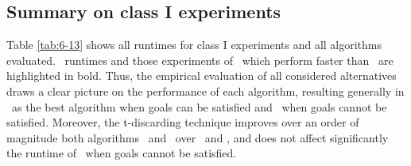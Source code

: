 \subsection{Summary on class I experiments}
\label{chapEmpiricalAnalysis:subsec:summarygridsfinalc1}

Table \ref{tab:6-13} shows all runtimes for class I experiments and all algorithms evaluated. \namoate \ runtimes and those experiments of \lexgo \ which perform faster than \namoate \ are highlighted in bold. Thus, the empirical evaluation of all considered alternatives draws a clear picture on the performance of each algorithm, resulting generally in \namoate \ as the best algorithm when goals can be satisfied and \lexgote \ when goals cannot be satisfied. Moreover, the t-discarding technique improves over an order of magnitude both algorithms \namoate \ and \lexgote \ over \namoa \ and \lexgo, and does not affect significantly the runtime of \lexgo \ when goals cannot be satisfied. 


